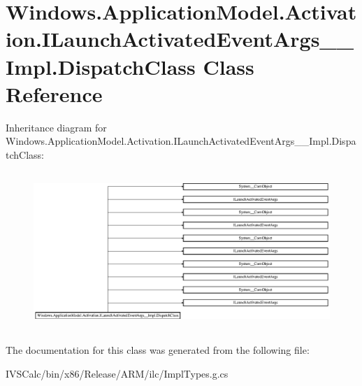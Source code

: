 \hypertarget{class_windows_1_1_application_model_1_1_activation_1_1_i_launch_activated_event_args_____impl_1_1_dispatch_class}{}\section{Windows.\+Application\+Model.\+Activation.\+I\+Launch\+Activated\+Event\+Args\+\_\+\+\_\+\+Impl.\+Dispatch\+Class Class Reference}
\label{class_windows_1_1_application_model_1_1_activation_1_1_i_launch_activated_event_args_____impl_1_1_dispatch_class}
Inheritance diagram for Windows.\+Application\+Model.\+Activation.\+I\+Launch\+Activated\+Event\+Args\+\_\+\+\_\+\+Impl.\+Dispatch\+Class\+:\begin{figure}[H]
\begin{center}
\leavevmode
\includegraphics[height=6.003899cm]{class_windows_1_1_application_model_1_1_activation_1_1_i_launch_activated_event_args_____impl_1_1_dispatch_class}
\end{center}
\end{figure}


The documentation for this class was generated from the following file\+:\begin{DoxyCompactItemize}
\item 
I\+V\+S\+Calc/bin/x86/\+Release/\+A\+R\+M/ilc/Impl\+Types.\+g.\+cs\end{DoxyCompactItemize}
